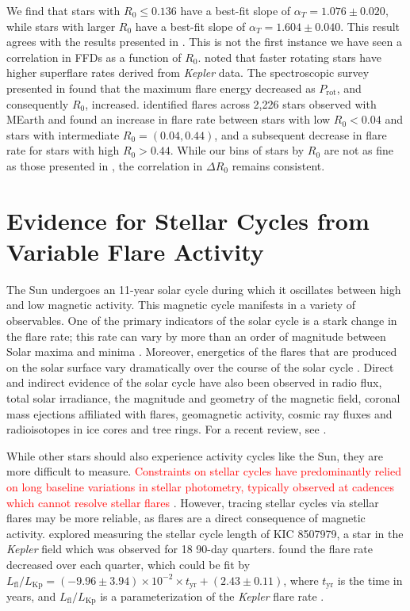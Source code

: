 \documentclass[twocolumn, linenumbers]{aastex631}
\begin{document}
We find that stars with $R_0 \leq 0.136$ have a best-fit slope of
$\alpha_T = 1.076 \pm 0.020$, while stars with larger $R_0$ have a best-fit slope
of $\alpha_T = 1.604 \pm 0.040$. This result agrees with the results presented in
\cite{seligman22}. This is not the first instance we have seen a correlation in FFDs
as a function of $R_0$. \cite{candelaresi14} noted that faster rotating stars have
higher superflare rates derived from \textit{Kepler} data. The spectroscopic survey
presented in \cite{notsu19} found that the maximum flare energy decreased as
$P_\textrm{rot}$, and consequently $R_0$, increased. \cite{mondrik19} identified
flares across 2,226 stars observed with MEarth and found an increase in flare rate
between stars with low $R_0 < 0.04$ and stars with intermediate $R_0 = (0.04, 0.44)$,
and a subsequent decrease in flare rate for stars with high $R_0 > 0.44$. While our
bins of stars by $R_0$ are not as fine as those presented in \cite{mondrik19}, the
correlation in $\Delta R_0$ remains consistent.


\section{Evidence for Stellar Cycles from Variable Flare Activity}\label{sec:cycles}

The Sun undergoes an 11-year solar cycle during  which it oscillates between high and
low magnetic activity. This magnetic cycle manifests  in a variety of observables. One
of the primary indicators of the solar cycle is a stark change in the flare rate; this
rate can vary by more than an order of magnitude between Solar maxima and minima
\citep{webb94}. Moreover, energetics of the flares that are produced on the solar
surface vary dramatically over the course of the solar cycle \citep{Bai1987,Bai2003}.
Direct and indirect evidence  of the solar cycle have also been observed in radio flux,
total solar irradiance, the magnitude and geometry of the magnetic field, coronal
mass ejections affiliated with flares, geomagnetic activity, cosmic ray fluxes and
radioisotopes in ice cores and tree rings. For a recent review, see \citet{Hathaway2015}.


While other stars should also experience activity cycles like the Sun, they are
more difficult to measure. \textcolor{red}{Constraints on stellar cycles have
predominantly relied on long baseline variations in stellar photometry, typically
observed at cadences which cannot resolve stellar flares \citep[see recent reviews
by ][]{jeffers23, isik23}}. However,  tracing stellar cycles via stellar flares may
be more reliable, as flares are a direct consequence of magnetic activity. \cite{scoggins19}
explored measuring the stellar cycle length of KIC 8507979, a star in the \textit{Kepler}
field which was observed for 18 90-day quarters. \cite{scoggins19} found the flare rate
decreased over each quarter, which could be fit by
$L_\textrm{fl}/L_\textrm{Kp} = (-9.96 \pm 3.94) \times 10^{-2} \times t_\textrm{yr} + (2.43 \pm 0.11)$,
where $t_\textrm{yr}$ is the time in years, and $L_\textrm{fl}/L_\textrm{Kp}$ is
a parameterization of the \textit{Kepler} flare rate \citep{lurie15}.
\end{document}
